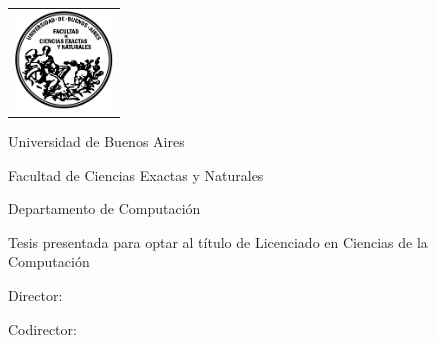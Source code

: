 \newcommand{\HRule}{\rule{\linewidth}{0.2mm}}
%
\thispagestyle{empty}

\begin{center}\leavevmode

\vspace{-2cm}

\begin{tabular}{l}
\includegraphics[width=2.6cm]{logofcen.pdf}
\end{tabular}


{\large \sc Universidad de Buenos Aires

Facultad de Ciencias Exactas y Naturales

Departamento de Computaci\'on}

\vspace{6.0cm}


\begin{huge}
\textbf{\tituloTesis}
\end{huge}

\vspace{2cm}

{\large Tesis presentada para optar al título de Licenciado en Ciencias de la Computaci\'on}

\vspace{2cm}

{\Large \autor}

\end{center}

\vfill

{\large

{Director: \director}

\vspace{.2cm}

{Codirector: \codirector}

\vspace{.2cm}

\lugar
}

\newpage\thispagestyle{empty}
